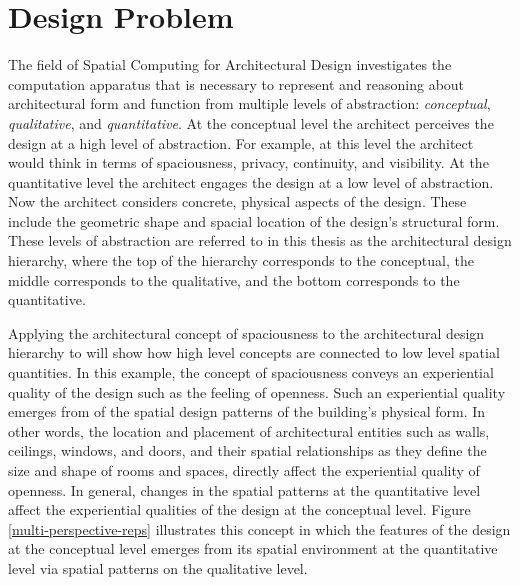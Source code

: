 \documentclass[12pt]{ucthesis}
\begin{document}
\section{Design Problem}
The field of Spatial Computing for Architectural Design \cite{bhatt-spatial-computing} investigates the computation apparatus that is necessary to represent and reasoning about architectural form and function from multiple levels of abstraction: \emph{conceptual}, \emph{qualitative}, and \emph{quantitative}. At the conceptual level the architect perceives the design at a high level of abstraction. For example, at this level the architect would think in terms of spaciousness, privacy, continuity, and visibility. At the quantitative level the architect engages the design at a low level of abstraction. Now the architect considers concrete, physical aspects of the design. These include the geometric shape and spacial location of the design's structural form. These levels of abstraction are referred to in this thesis as the architectural design hierarchy, where the top of the hierarchy corresponds to the conceptual, the middle corresponds to the qualitative, and the bottom corresponds to the quantitative. 



Applying the architectural concept of spaciousness to the architectural design hierarchy to will show how high level concepts are connected to low level spatial quantities. In this example, the concept of spaciousness conveys an experiential quality of the design such as the feeling of openness. Such an experiential quality emerges from of the spatial design patterns of the building's physical form. In other words, the location and placement of architectural entities such as walls, ceilings, windows, and doors, and their spatial relationships as they define the size and shape of rooms and spaces, directly affect the experiential quality of openness. In general, changes in the spatial patterns at the quantitative level affect the experiential qualities of the design at the conceptual level. Figure \ref{multi-perspective-reps} illustrates this concept in which the features of the design at the conceptual level emerges from its spatial environment at the quantitative level via spatial patterns on the qualitative level. 
\end{document}
